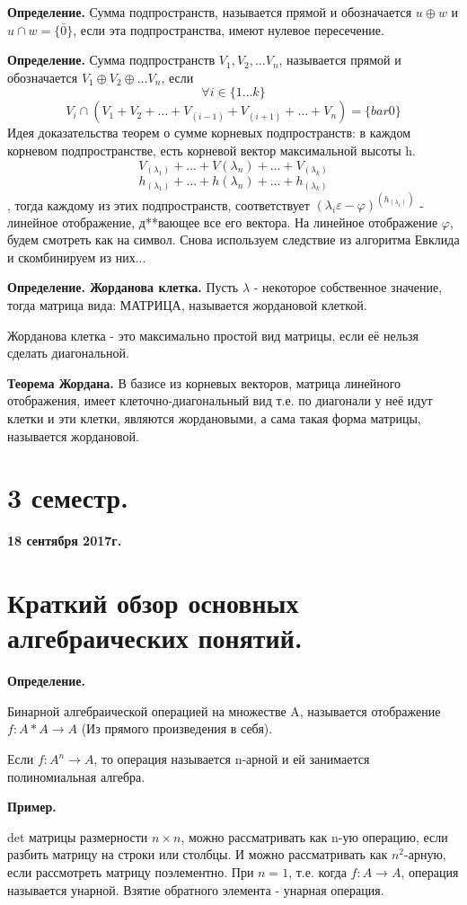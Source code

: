 \documentclass{article}
\begin{document}
{\bf Определение.} Сумма подпространств, называется прямой и обозначается $u\oplus w$ и $u\cap w=\{\bar{0}\}$, если эта подпространства, имеют нулевое пересечение.

{\bf Определение.} Сумма подпространств $V_1, V_2, \ldots V_n$, называется прямой и обозначается $V_1\oplus V_2\oplus\ldots V_n$, если $$\forall i \in \{1\ldots k\}$$
$$V_i \cap(V_1+V_2+\ldots+V_(i-1)+V_(i+1)+\ldots+V_n)=\{bar{0}\}$$
Идея доказательства теорем о сумме корневых подпространств: в каждом корневом подпространстве, есть корневой вектор максимальной высоты h.
$$V_(\lambda_1)+\ldots+V(\lambda_n)+\ldots+V_(\lambda_k)$$
$$h_(\lambda_1)+\ldots+h(\lambda_n)+\ldots+h_(\lambda_k)$$, тогда каждому из этих подпространств, соответствует $(\lambda_i\varepsilon-\varphi)^(h_(\lambda_1))$ - линейное отображение, д**вающее все его вектора. На линейное отображение $\varphi$, будем смотреть как на символ. Снова используем следствие из алгоритма Евклида и скомбинируем из них...

{\bf Определение. Жорданова клетка.} Пусть $\lambda$ - некоторое собственное значение, тогда матрица вида: МАТРИЦА, называется жордановой клеткой.

Жорданова клетка - это максимально простой вид матрицы, если её нельзя сделать диагональной.

{\bf Теорема Жордана.} В базисе из корневых векторов, матрица линейного отображения, имеет клеточно-диагональный вид т.е. по диагонали у неё идут клетки и эти клетки, являются жордановыми, а сама такая форма матрицы, называется жордановой.

\section*{3 семестр.}

\textbf {18 сентября 2017г.}
\section*{ Краткий обзор основных алгебраических понятий.}

{\bf Определение.}

Бинарной алгебраической операцией на множестве A, называется отображение $f: A*A \rightarrow A$ (Из прямого произведения в себя).

Если  $f: A^n \rightarrow A$, то операция называется n-арной и ей занимается полиномиальная алгебра.

{\bf Пример.}

det матрицы размерности $n \times n$, можно рассматривать как n-ую операцию, если разбить матрицу на строки или столбцы. И можно рассматривать как $n^2$-арную, если рассмотреть матрицу поэлементно. При $n=1$, т.е. когда $f: A \rightarrow A$, операция называется унарной. Взятие обратного элемента - унарная операция.
\end{document}
